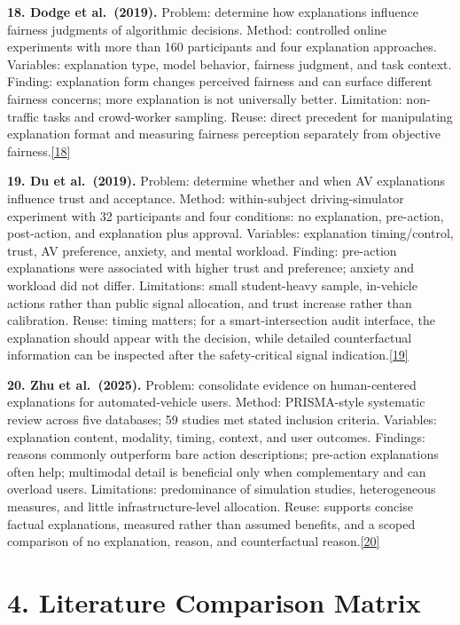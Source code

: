 \documentclass[
  english,
  11pt,
  a4paper,
]{article}
\begin{document}
\textbf{18. Dodge et al.~(2019).} Problem: determine how explanations
influence fairness judgments of algorithmic decisions. Method:
controlled online experiments with more than 160 participants and four
explanation approaches. Variables: explanation type, model behavior,
fairness judgment, and task context. Finding: explanation form changes
perceived fairness and can surface different fairness concerns; more
explanation is not universally better. Limitation: non-traffic tasks and
crowd-worker sampling. Reuse: direct precedent for manipulating
explanation format and measuring fairness perception separately from
objective fairness.\hyperref[source-18]{[18]}

\textbf{19. Du et al.~(2019).} Problem: determine whether and when AV
explanations influence trust and acceptance. Method: within-subject
driving-simulator experiment with 32 participants and four conditions:
no explanation, pre-action, post-action, and explanation plus approval.
Variables: explanation timing/control, trust, AV preference, anxiety,
and mental workload. Finding: pre-action explanations were associated
with higher trust and preference; anxiety and workload did not differ.
Limitations: small student-heavy sample, in-vehicle actions rather than
public signal allocation, and trust increase rather than calibration.
Reuse: timing matters; for a smart-intersection audit interface, the
explanation should appear with the decision, while detailed
counterfactual information can be inspected after the safety-critical
signal indication.\hyperref[source-19]{[19]}

\textbf{20. Zhu et al.~(2025).} Problem: consolidate evidence on
human-centered explanations for automated-vehicle users. Method:
PRISMA-style systematic review across five databases; 59 studies met
stated inclusion criteria. Variables: explanation content, modality,
timing, context, and user outcomes. Findings: reasons commonly
outperform bare action descriptions; pre-action explanations often help;
multimodal detail is beneficial only when complementary and can overload
users. Limitations: predominance of simulation studies, heterogeneous
measures, and little infrastructure-level allocation. Reuse: supports
concise factual explanations, measured rather than assumed benefits, and
a scoped comparison of no explanation, reason, and counterfactual
reason.\hyperref[source-20]{[20]}

\section{4. Literature Comparison
Matrix}\label{literature-comparison-matrix}
\end{document}
